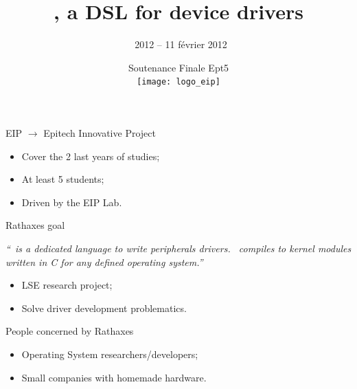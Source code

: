 \documentclass[xcolor={usenames,svgnames}]{beamer}
\title{\rtx, a DSL for device drivers}
\date[Soutenance Finale Ept5]{Soutenance Finale Ept5 \\ \vspace{10pt} \texttt{[image: logo\_eip]}}
\author[\rtx\ 2012 -- 11 février 2012]{\rtx\ 2012 -- 11 février 2012 \vspace{-20pt}}
\begin{document}
\begin{frame}
\titlepage
\end{frame}

\begin{frame}{EIP $\rightarrow$ Epitech Innovative Project}
\Large{
\begin{itemize}
\item Cover the 2 last years of studies;
\item At least 5 students;
\item Driven by the EIP Lab.
\end{itemize}
}
\end{frame}

\begin{frame}{Rathaxes goal}
\Large{
\textrm{\itshape{``\rtx\ is a \textcolor{rathaxesred}{dedicated language} to
\textcolor{rathaxesred}{write peripherals drivers}. \rtx\ compiles to kernel
modules written in C for any defined operating system.''}}
\vspace{2em}
\begin{itemize}
\item LSE research project;
\item Solve driver development problematics.
\end{itemize}
}
\end{frame}

\begin{frame}{People concerned by Rathaxes}
\Large{
\begin{itemize}
\item Operating System researchers/developers;
\item Small companies with homemade hardware.
\end{itemize}
}
\end{frame}
\end{document}
